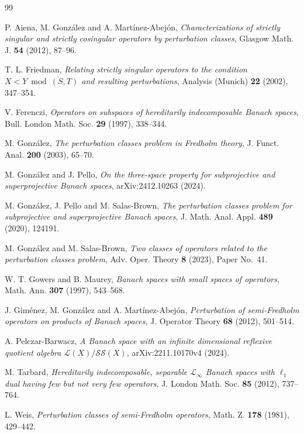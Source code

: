 \documentclass[11pt]{article}
\theoremstyle{definition}
\newcommand{\Lop}{\mathcal L}
\newcommand{\SSing}{\mathcal{SS}}
\begin{document}
\begin{thebibliography}{99}

P. Aiena, M. Gonz\'alez and A. Mart\'inez-Abej\'on,
\emph{Characterizations of strictly singular and strictly cosingular operators by
perturbation classes}, Glasgow Math. J. \textbf{54} (2012), 87--96.

T. L. Friedman,
\emph{Relating strictly singular operators to the condition \(X<Y\bmod(S,T)\) and
resulting perturbations}, Analysis (Munich) \textbf{22} (2002), 347--354.

V. Ferenczi,
\emph{Operators on subspaces of hereditarily indecomposable Banach spaces},
Bull. London Math. Soc. \textbf{29} (1997), 338--344.

M. Gonz\'alez,
\emph{The perturbation classes problem in Fredholm theory},
J. Funct. Anal. \textbf{200} (2003), 65--70.

M. Gonz\'alez and J. Pello,
\emph{On the three-space property for subprojective and superprojective Banach spaces},
arXiv:2412.10263 (2024).

M. Gonz\'alez, J. Pello and M. Salas-Brown,
\emph{The perturbation classes problem for subprojective and superprojective Banach
spaces}, J. Math. Anal. Appl. \textbf{489} (2020), 124191.

M. Gonz\'alez and M. Salas-Brown,
\emph{Two classes of operators related to the perturbation classes problem},
Adv. Oper. Theory \textbf{8} (2023), Paper No.~41.

W. T. Gowers and B. Maurey,
\emph{Banach spaces with small spaces of operators},
Math. Ann. \textbf{307} (1997), 543--568.

J. Gim\'enez, M. Gonz\'alez and A. Mart\'inez-Abej\'on,
\emph{Perturbation of semi-Fredholm operators on products of Banach spaces},
J. Operator Theory \textbf{68} (2012), 501--514.

A. Pelczar-Barwacz,
\emph{A Banach space with an infinite dimensional reflexive quotient algebra
\(\Lop(X)/\SSing(X)\)}, arXiv:2211.10170v4 (2024).

M. Tarbard,
\emph{Hereditarily indecomposable, separable \(\mathcal L_\infty\) Banach spaces with
\(\ell_1\) dual having few but not very few operators},
J. London Math. Soc. \textbf{85} (2012), 737--764.

L. Weis,
\emph{Perturbation classes of semi-Fredholm operators},
Math. Z. \textbf{178} (1981), 429--442.

\end{thebibliography}
\end{document}
